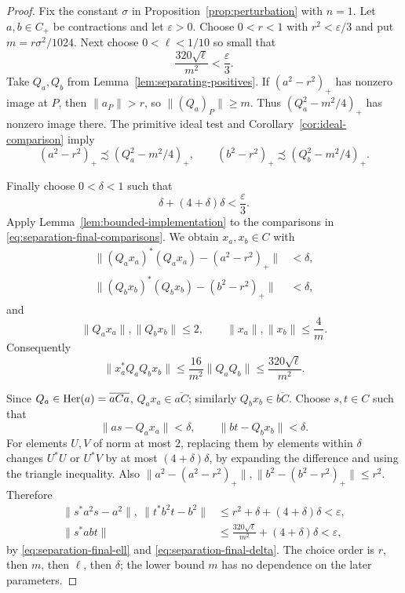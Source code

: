 \begin{proof}
Fix the constant $\sigma$ in Proposition~\ref{prop:perturbation} with
$n=1$.
Let $a,b\in C_+$ be contractions and let $\varepsilon>0$.
Choose $0<r<1$ with $r^2<\varepsilon/3$ and put
$m=r\sigma^2/1024$.  Next choose $0<\ell<1/10$ so small that
\begin{equation}\label{eq:separation-final-ell}
 \frac{320\sqrt\ell}{m^2}<\frac\varepsilon3.
\end{equation}
Take $Q_a,Q_b$ from Lemma~\ref{lem:separating-positives}.
If $(a^2-r^2)_+$ has nonzero image at $P$, then $\|a_P\|>r$,
so $\|(Q_a)_P\|\ge m$.  Thus $(Q_a^2-m^2/4)_+$ has nonzero
image there.  The primitive ideal test and
Corollary~\ref{cor:ideal-comparison} imply
\begin{equation}\label{eq:separation-final-comparisons}
 (a^2-r^2)_+\precsim(Q_a^2-m^2/4)_+,\qquad
 (b^2-r^2)_+\precsim(Q_b^2-m^2/4)_+.
\end{equation}

Finally choose $0<\delta<1$ such that
\begin{equation}\label{eq:separation-final-delta}
 \delta+(4+\delta)\delta<\frac\varepsilon3.
\end{equation}
Apply Lemma~\ref{lem:bounded-implementation} to the comparisons in
\eqref{eq:separation-final-comparisons}.  We obtain $x_a,x_b\in C$
with
\begin{align*}
 \|(Q_ax_a)^*(Q_ax_a)-(a^2-r^2)_+\|&<\delta,\\
 \|(Q_bx_b)^*(Q_bx_b)-(b^2-r^2)_+\|&<\delta,
\end{align*}
and
\[
 \|Q_ax_a\|,\|Q_bx_b\|\le2,\qquad
 \|x_a\|,\|x_b\|\le\frac4m.
\]
Consequently
\begin{equation}\label{eq:separation-implemented-product}
 \|x_a^*Q_aQ_bx_b\|
 \le\frac{16}{m^2}\|Q_aQ_b\|
 \le\frac{320\sqrt\ell}{m^2}.
\end{equation}

Since $Q_a\in\operatorname{Her}(a)=\overline{aCa}$,
$Q_ax_a\in\overline{aC}$; similarly $Q_bx_b\in\overline{bC}$.
Choose $s,t\in C$ such that
\[
 \|as-Q_ax_a\|<\delta,\qquad
 \|bt-Q_bx_b\|<\delta.
\]
For elements $U,V$ of norm at most $2$, replacing them by elements
within $\delta$ changes $U^*U$ or $U^*V$ by at most
$(4+\delta)\delta$, by expanding the difference and using the
triangle inequality.  Also
$\|a^2-(a^2-r^2)_+\|,\|b^2-(b^2-r^2)_+\|\le r^2$.
Therefore
\begin{align*}
 \|s^*a^2s-a^2\|,
 \ \|t^*b^2t-b^2\|
 &\le r^2+\delta+(4+\delta)\delta<\varepsilon,\\
 \|s^*abt\|
 &\le\frac{320\sqrt\ell}{m^2}+(4+\delta)\delta<\varepsilon,
\end{align*}
by \eqref{eq:separation-final-ell} and
\eqref{eq:separation-final-delta}.
The choice order is $r$, then $m$, then $\ell$, then $\delta$;
the lower bound $m$ has no dependence on the later parameters.


\end{proof}
